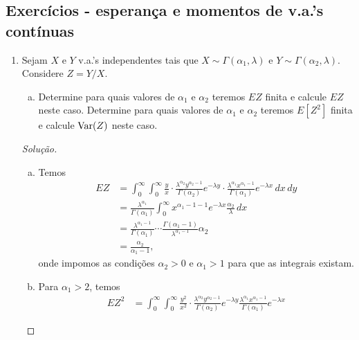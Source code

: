 \documentclass[../Notas.tex]{subfiles}
\begin{document}
\subsection{Exercícios - esperança e momentos de v.a.'s contínuas}

\begin{enumerate}
    \item Sejam $X$ e $Y$ v.a.’s independentes tais que $X\sim\Gamma(\alpha_1,\lambda)$ e $Y\sim\Gamma(\alpha_2,\lambda)$. Considere $Z = Y/X$.
    \begin{enumerate}[a)]
    \item Determine para quais valores de $\alpha_1$ e $\alpha_ 2$ teremos $EZ$ finita e calcule $EZ$ neste caso.
    Determine para quais valores de $\alpha_1$ e $\alpha_2$ teremos $E[Z^2]$ finita e calcule $\text{Var}(Z)$ neste caso.
    \end{enumerate}
    \begin{proof}[Solução]
        \begin{enumerate}[a)]
            \item Temos
            \begin{align*}
                EZ &= \int_0^{\infty}\int_0^{\infty} \frac{y}{x}
                \cdot\frac{\lambda^{\alpha_2}y^{\alpha_2-1}}{\Gamma(\alpha_2)}
                e^{-\lambda y}
                \cdot\frac{\lambda^{\alpha_1}x^{\alpha_1-1}}{\Gamma(\alpha_1)}
                e^{-\lambda x} \, dx \, dy \\
                   &= \frac{\lambda^{\alpha_1}}{\Gamma(\alpha_1)}
                   \int_0^{\infty} x^{\alpha_1-1-1}e^{-\lambda x}
                   \frac{\alpha_2}{\lambda} \, dx \\
                   &= \frac{\lambda^{\alpha_1 - 1}}{\Gamma(\alpha_1)}\cdots
                   \frac{\Gamma(\alpha_1 - 1)}{\lambda^{\alpha_1-1}}\alpha_2 \\
                   &= \frac{\alpha_2}{\alpha_1-1},
            \end{align*}
            onde impomos as condições $\alpha_2>0$ e $\alpha_1>1$ para que as integrais
            existam.
            \item Para $\alpha_1 > 2$, temos
            \begin{align*}
                EZ^2 &= \int_0^{\infty}\int_0^{\infty} \frac{y^2}{x^2}\cdot
                \frac{\lambda^{\alpha_2}y^{\alpha_2-1}}{\Gamma(\alpha_2)}e^{-\lambda y}
                \frac{\lambda^{\alpha_1}x^{\alpha_1-1}}{\Gamma(\alpha_1)}e^{-\lambda x}

\end{align*}
\end{enumerate}
\end{proof}
\end{enumerate}
\end{document}
